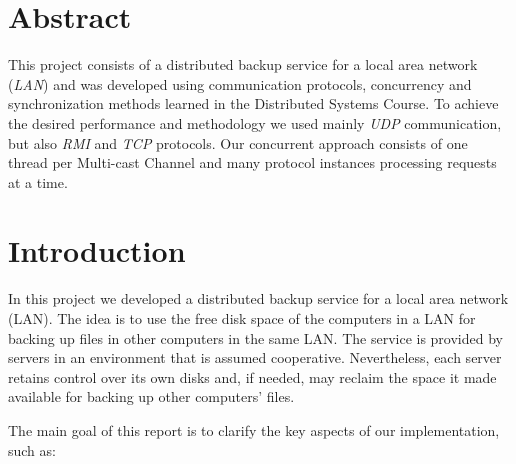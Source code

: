 \documentclass[a4paper]{article}
\begin{document}

\newpage

\section*{Abstract}

    This project consists of a distributed backup service for a local area network (\textit{LAN}) and was developed using communication protocols, concurrency and synchronization methods learned in the Distributed Systems Course. To achieve the desired performance and methodology we used mainly \textit{UDP} communication, but also \textit{RMI} and \textit{TCP} protocols. Our concurrent approach consists of one thread per Multi-cast Channel and many protocol instances processing requests at a time.


\newpage

\tableofcontents




\newpage

\section{Introduction}

    In this project we developed a distributed backup service for a local area network (LAN). The idea is to use the free disk space of the computers in a LAN for backing up files in other computers in the same LAN. The service is provided by servers in an environment that is assumed cooperative. Nevertheless, each server retains control over its own disks and, if needed, may reclaim the space it made available for backing up other computers' files.
    
    The main goal of this report is to clarify the key aspects of our implementation, such as:
\end{document}
